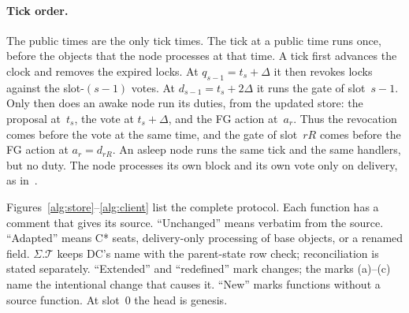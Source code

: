 \documentclass{article}
\theoremstyle{plain}
\theoremstyle{definition}
\theoremstyle{remark}
\newcommand{\T}{\mathcal T}
\newcommand{\SAS}{\cite{SAS}}
\begin{document}
\paragraph{Tick order.}\label{par:tick-order}  The public times are the only tick times.  The
tick at a public time runs once, before the objects that the node
processes at that time.  A tick first advances the clock and removes
the expired locks.  At $q_{s-1}=t_s+\Delta$ it then revokes locks
against the slot-$(s-1)$ votes.  At $d_{s-1}=t_s+2\Delta$ it runs the
gate of slot~$s-1$.  Only then does an awake node run its duties, from
the updated store: the proposal at~$t_s$, the vote at $t_s+\Delta$, and
the FG action at~$a_r$.  Thus the revocation comes before the vote at the
same time, and the gate of slot~$rR$ comes before the FG action at
$a_r=d_{rR}$.  An asleep node runs the same tick and the same handlers,
but no duty.  The node processes its own block and its own vote only on
delivery, as in~\SAS.

Figures~\ref{alg:store}--\ref{alg:client} list the complete protocol.
Each function has a comment that gives its source.  ``Unchanged'' means
verbatim from the source.  ``Adapted'' means C* seats, delivery-only
processing of base objects, or a renamed field.  $\Sigma.\T$ keeps
DC's name with the parent-state row check; reconciliation is stated separately.  ``Extended'' and
``redefined'' mark changes; the marks (a)--(c) name the intentional
change that causes it.  ``New'' marks functions without a source
function.  At slot~$0$ the head is genesis.
\end{document}
